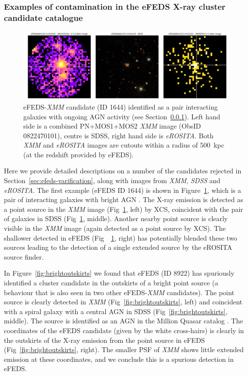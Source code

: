 \documentclass[fleqn,usenatbib]{mnras}
\begin{document}
\subsubsection{Examples of contamination in the eFEDS X-ray cluster candidate catalogue}
\label{sec:examplerejects}

\begin{figure}
    \centering
    \includegraphics[width=1\textwidth]{images/interactingagn.png}
    \caption[]{eFEDS-{\em XMM} candidate (ID 1644) identified as a pair interacting galaxies with ongoing AGN activity (see Section~\ref{sec:examplerejects}). Left hand side is a combined PN+MOS1+MOS2 {\em XMM} image (ObsID 0822470101), centre is SDSS, right hand side is {\em eROSITA}.  Both {\em XMM} and {\em eROSITA} images are cutouts within a radius of 500~kpc (at the redshift provided by eFEDS).}
    \label{fig:pairagn}
\end{figure}

Here we provide detailed descriptions on a number of the candidates rejected in Section~\ref{sec:efeds-varification}, along with images from {\em XMM}, {\em SDSS} and {\em eROSITA}.  The first example (eFEDS ID 1644) is shown in Figure~\ref{fig:pairagn}, which is a pair of interacting galaxies with bright AGN \citep[as discussed in][]{agnpair}.  The X-ray emission is detected as a point source in the {\em XMM} image (Fig~\ref{fig:pairagn}, left) by XCS, coincident with the pair of galaxies in SDSS (Fig~\ref{fig:pairagn}, middle).  Another nearby point source is clearly visible in the {\em XMM} image (again detected as a point source by XCS).  The shallower detected in eFEDS (Fig~~\ref{fig:pairagn}, right) has potentially blended these two sources leading to the detection of a single extended source by the eROSITA source finder.

In Figure~\ref{fig:brightoutskirts} we found that eFEDS (ID 8922) has spuriously identified a cluster candidate in the outskirts of a bright point source (a behaviour that is also seen in two other eFEDS-{\em XMM} candidates).  The point source is clearly detected in {\em XMM} (Fig~\ref{fig:brightoutskirts}, left) and coincident with a spiral galaxy with a central AGN in SDSS (Fig~\ref{fig:brightoutskirts}, middle).  The source is identified as an AGN in the Million Quasar catalog \citep{milliquas}.  The coordinates of the eFEDS candidate (given by the white cross-hairs) is clearly in the outskirts of the X-ray emission from the point source in eFEDS (Fig~\ref{fig:brightoutskirts}, right).  The smaller PSF of {\em XMM} shows little extended emission at these coordinates, and we conclude this is a spurious detection in eFEDS.
\end{document}
